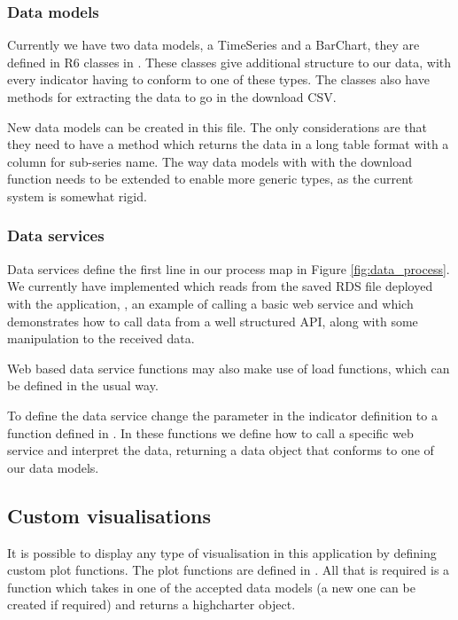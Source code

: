 \documentclass[12pt]{article}
\begin{document}
\subsubsection{Data models}\label{sec:data_models}

Currently we have two data models, a TimeSeries and a BarChart, they are defined in R6 classes in .  These classes give additional structure to our data, with every indicator having to conform to one of these types.  The classes also have methods for extracting the data to go in the download CSV.

New data models can be created in this file.  The only considerations are that they need to have a method  which returns the data in a long table format with a column for sub-series name.  The way data models with with the download function needs to be extended to enable more generic types, as the current system is somewhat rigid.

\subsubsection{Data services}

Data services define the first line in our process map in Figure \ref{fig:data_process}.  We currently have implemented  which reads from the saved RDS file deployed with the application, , an example of calling a basic web service and  which demonstrates how to call data from a well structured API, along with some manipulation to the received data.

Web based data service functions may also make use of load functions, which can be defined in the usual way.

To define the data service change the  parameter in the indicator definition to a function defined in .  In these functions we define how to call a specific web service and interpret the data, returning a data object that conforms to one of our data models.

\subsection{Custom visualisations}

It is possible to display any type of visualisation in this application by defining custom plot functions.  The plot functions are defined in .  All that is required is a function which takes in one of the accepted data models (a new one can be created if required) and returns a highcharter object.
\end{document}
